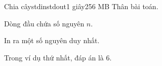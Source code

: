 \begin{problem}{Chia cây}{stdin}{stdout}{1 giây}{256 MB}
Thân bài toán.

\InputFile
Dòng đầu chứa số nguyên $n$.

\OutputFile
In ra một số nguyên duy nhất.

\Explanation
Trong ví dụ thứ nhất, đáp án là $6$.
\end{problem}
